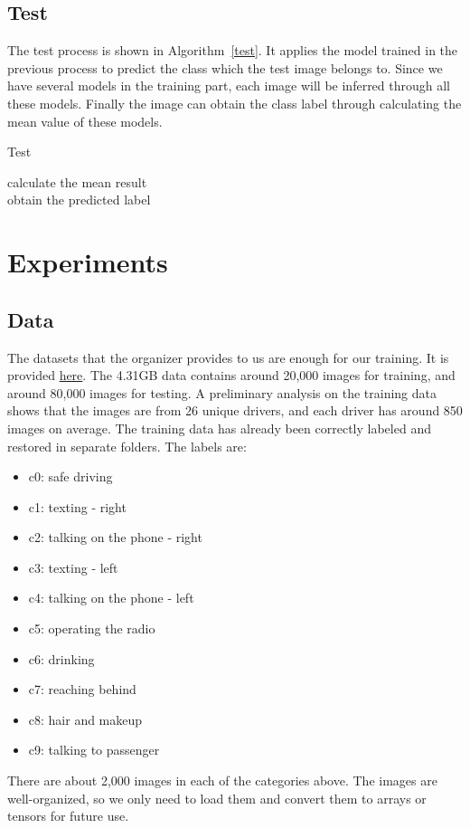 \documentclass[final]{cvpr}
\begin{document}
\subsection{Test}
The test process is shown in Algorithm~\ref{test}. It applies the model trained in the previous process to predict the class which the test image belongs to. Since we have several models in the training part, each image will be inferred through all these models. Finally the image can obtain the class label through calculating the mean value of these models.

\begin{algorithm}\label{test}
    \caption{Test}
    
    calculate the mean result \\
    obtain the predicted label \\
\end{algorithm}


\section{Experiments}
\subsection{Data}
        The datasets that the organizer provides to us are enough for our training. It is provided \href{https://www.kaggle.com/code/seele1917/state-farm-distracted-driver-detection-answer/data}{here}. The 4.31GB data contains around 20,000 images for training, and around 80,000 images for testing. A preliminary analysis on the training data shows that the images are from 26 unique drivers, and each driver has around 850 images on average. The training data has already been correctly labeled and restored in separate folders. The labels are:
\begin{itemize}
    \item c0: safe driving
    \item c1: texting - right
    \item c2: talking on the phone - right
    \item c3: texting - left
    \item c4: talking on the phone - left
    \item c5: operating the radio
    \item c6: drinking
    \item c7: reaching behind
    \item c8: hair and makeup
    \item c9: talking to passenger
\end{itemize}
There are about 2,000 images in each of the categories above. The images are well-organized, so we only need to load them and convert them to arrays or tensors for future use.
          
\end{document}
